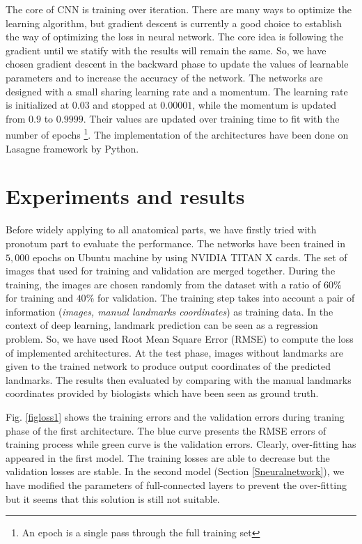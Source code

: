 \documentclass[review]{elsarticle}
\begin{document}
The core of CNN is training over iteration. There are many ways to optimize the learning algorithm, but gradient descent \cite{lecun2012efficient} is currently a good choice to establish the way of optimizing the loss in neural network. The core idea is following the gradient until we statify with the results will remain the same. So, we have chosen gradient descent in the backward phase to update the values of learnable parameters and to increase the accuracy of the network. The networks are designed with a small sharing learning rate and a momentum. The learning rate is initialized at $0.03$ and stopped at $0.00001$, while the momentum is updated from $0.9$ to $0.9999$. Their values are updated over training time to fit with the number of epochs \footnote{An epoch is a single pass through the full training set}. The implementation of the architectures have been done on Lasagne framework \cite{lasagne} by Python. 

\section{Experiments and results}
\label{sexperiments}
Before widely applying to all anatomical parts, we have firstly tried with pronotum part to evaluate the performance. The networks have been trained in $5, 000$ epochs on Ubuntu machine by using NVIDIA TITAN X cards. The set of images that used for training and validation are merged together. During the training, the images are chosen randomly from the dataset with a ratio of $60\%$ for training and $40\%$ for validation. The training step takes into account a pair of information (\textit{images, manual landmarks coordinates})  as training data. In the context of deep learning, landmark prediction can be seen as a regression problem. So, we have used Root Mean Square Error (RMSE) to compute the loss of implemented architectures. At the test phase, images without landmarks are given to the trained network to produce output coordinates of the predicted landmarks. The results then evaluated by comparing with the manual landmarks coordinates provided by biologists which have been seen as ground truth. 

Fig. \ref{figloss1} shows the training errors and the validation errors during traning phase of the first architecture. The blue curve presents the RMSE errors of training process while green curve is the validation errors. Clearly, over-fitting has appeared in the first model. The training losses are able to decrease but the validation losses are stable. In the second model (Section \ref{Sneuralnetwork}), we have modified the parameters of full-connected layers to prevent the over-fitting but it seems that this solution is still not suitable.
\end{document}
